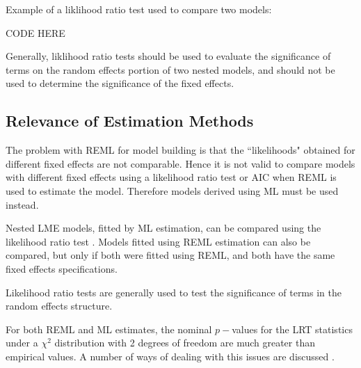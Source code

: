 \documentclass[MAIN.tex]{subfiles}
\begin{document}
Example of a liklihood ratio test used to compare two models: 

CODE HERE


Generally, liklihood ratio tests should be used to evaluate the significance of terms on the 
random effects portion of two nested models, and should not be used to determine the 
significance of the fixed effects. 






	\subsection{Relevance of Estimation Methods}
	
	The problem with REML for model building is that the ``likelihoods" obtained for different fixed effects are not comparable. Hence it is not valid to compare models with different fixed effects using a likelihood ratio test or AIC when REML is used to estimate the model. Therefore models derived using ML must be used instead.
	
	
	
	Nested LME models, fitted by ML estimation, can be compared using the likelihood ratio test \citep{Lehmann2006}.
	Models fitted using REML estimation can also be compared, but only if both were fitted using REML, and both have the same fixed effects specifications.
	
	Likelihood ratio tests are generally used to test the significance of terms in the random effects structure.
	
	
	
	
	
	
	For both REML and ML estimates, the nominal $p-$values for the LRT statistics under a $\chi^2$ distribution with 2 degrees of freedom are much greater than empirical values. A number of ways of dealing with this issues are discussed \citep[pg.86]{pb}.
	
\end{document}
